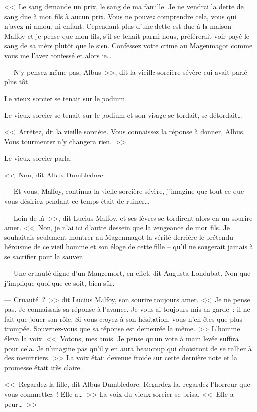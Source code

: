 <<~Le sang demande un prix, le sang de ma famille. Je ne vendrai la dette de sang due à mon fils à aucun prix. Vous ne pouvez comprendre cela, vous qui n'avez ni amour ni enfant. Cependant plus d'une dette est due à la maison Malfoy et je pense que mon fils, s'il se tenait parmi nous, préférerait voir payé le sang de sa mère plutôt que le sien. Confessez votre crime au Magenmagot comme vous me l'avez confessé et alors je…

--- N'y pensez même pas, Albus~>>, dit la vieille sorcière sévère qui avait parlé plus tôt.

Le vieux sorcier se tenait sur le podium.

Le vieux sorcier se tenait sur le podium et son visage se tordait, se détordait…

<<~Arrêtez, dit la vieille sorcière. Vous connaissez la réponse à donner, Albus. Vous tourmenter n'y changera rien.~>>

Le vieux sorcier parla.

<<~Non, dit Albus Dumbledore.

--- Et vous, Malfoy, continua la vielle sorcière sévère, j'imagine que tout ce que vous désiriez pendant ce temps était de ruiner…

--- Loin de là~>>, dit Lucius Malfoy, et ses lèvres se tordirent alors en un sourire amer. <<~Non, je n'ai ici d'autre dessein que la vengeance de mon fils. Je souhaitais seulement montrer au Magenmagot la vérité derrière le prétendu héroïsme de ce vieil homme et son éloge de cette fille -- qu'il ne songerait jamais à se sacrifier pour la sauver.

--- Une cruauté digne d'un Mangemort, en effet, dit Augusta Londubat. Non que j'implique quoi que ce soit, bien sûr.

--- Cruauté~?~>> dit Lucius Malfoy, son sourire toujours amer. <<~Je ne pense pas. Je connaissais sa réponse à l'avance. Je vous ai toujours mis en garde~: il ne fait que jouer son rôle. Si vous croyez à son hésitation, vous n'en êtes que plus trompée. Souvenez-vous que sa réponse est demeurée la même.~>> L'homme éleva la voix. <<~Votons, mes amis. Je pense qu'un vote à main levée suffira pour cela. Je n'imagine pas qu'il y en aura beaucoup qui choisiront de se rallier à des meurtriers.~>> La voix était devenue froide sur cette dernière note et la promesse était très claire.

<<~Regardez la fille, dit Albus Dumbledore. Regardez-la, regardez l'horreur que vous commettez~! Elle a…~>> La voix du vieux sorcier se brisa. <<~Elle a peur…~>>

